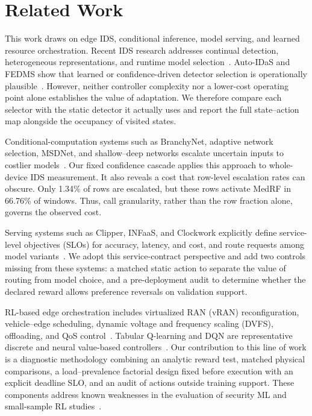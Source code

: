 \section{Related Work}
\label{sec:relwork}
This work draws on edge IDS, conditional inference, model serving, and learned resource orchestration. Recent IDS research addresses continual detection, heterogeneous representations, and runtime model selection~\cite{Wang2024BFSNID,AOCIDS2024,StatAvg2025,DMIDS2025}. Auto-IDaS and FEDMS show that learned or confidence-driven detector selection is operationally plausible~\cite{Lin2024AutoIDaS,Hasan2026FEDMS}. However, neither controller complexity nor a lower-cost operating point alone establishes the value of adaptation. We therefore compare each selector with the static detector it actually uses and report the full state–action map alongside the occupancy of visited states.

Conditional-computation systems such as BranchyNet, adaptive network selection, MSDNet, and shallow–deep networks escalate uncertain inputs to costlier models~\cite{Teerapittayanon2016BranchyNet,Bolukbasi2017Adaptive,Huang2018MSDNet,Kaya2019ShallowDeep}. Our fixed confidence cascade applies this approach to whole-device IDS measurement. It also reveals a cost that row-level escalation rates can obscure. Only 1.34\% of rows are escalated, but these rows activate MedRF in 66.76\% of windows. Thus, call granularity, rather than the row fraction alone, governs the observed cost.

Serving systems such as Clipper, INFaaS, and Clockwork explicitly define service-level objectives (SLOs) for accuracy, latency, and cost, and route requests among model variants~\cite{Crankshaw2017Clipper,Romero2021INFaaS,Gujarati2020Clockwork}. We adopt this service-contract perspective and add two controls missing from these systems: a matched static action to separate the value of routing from model choice, and a pre-deployment audit to determine whether the declared reward allows preference reversals on validation support.

RL-based edge orchestration includes virtualized RAN (vRAN) reconfiguration, vehicle--edge scheduling, dynamic voltage and frequency scaling (DVFS), offloading, and QoS control~\cite{Murti2024vRAN,Zhang2024VehicleEdge,Zhang2024DVFO,Lou2024Startup,Kim2024DistributedOffload,Maleki2024QCS,Nan2026RobustDNN,Wang2025TrustOffload,Hu2025SITOff}. Tabular Q-learning and DQN are representative discrete and neural value-based controllers~\cite{Watkins1992,Mnih2015}. Our contribution to this line of work is a diagnostic methodology combining an analytic reward test, matched physical comparisons, a load–prevalence factorial design fixed before execution with an explicit deadline SLO, and an audit of actions outside training support. These components address known weaknesses in the evaluation of security ML and small-sample RL studies~\cite{Arp2022,Agarwal2021}.
